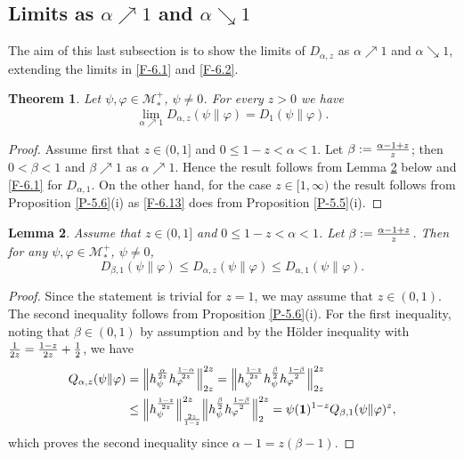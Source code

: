 \documentclass[12pt]{article}
\newtheorem{theorem}{Theorem}[section]
\newtheorem{lemma}[theorem]{Lemma}
\theoremstyle{definition}
\theoremstyle{remark}
\numberwithin{equation}{section}
\def\Me{\mathcal M}
\def\ffi{\varphi}
\def\1{\mathbf{1}}
\begin{document}
\subsection{Limits as $\alpha\nearrow1$ and $\alpha\searrow1$}

The aim of this last subsection is to show the limits of $D_{\alpha,z}$ as $\alpha\nearrow1$ and
$\alpha\searrow1$, extending the limits in \eqref{F-6.1} and \eqref{F-6.2}.

\begin{theorem}\label{T-6.7}
Let $\psi,\ffi\in\Me_*^+$, $\psi\ne0$. For every $z>0$ we have
\[
\lim_{\alpha\nearrow1}D_{\alpha,z}(\psi\|\ffi)=D_1(\psi\|\ffi).
\]
\end{theorem}

\begin{proof}
Assume first that $z\in(0,1]$ and $0\le1-z<\alpha<1$. Let $\beta:={\alpha-1+z\over z}$; then
$0<\beta<1$ and $\beta\nearrow1$ as $\alpha\nearrow1$. Hence the result follows from Lemma \ref{L-6.8}
below and \eqref{F-6.1} for $D_{\alpha,1}$. On the other hand, for the case $z\in[1,\infty)$ the result
follows from Proposition \ref{P-5.6}(i) as \eqref{F-6.13} does from Proposition \ref{P-5.5}(i).
\end{proof}

\begin{lemma}\label{L-6.8}
Assume that $z\in(0,1]$ and $0\le1-z<\alpha<1$. Let $\beta:={\alpha-1+z\over z}$. Then for any
$\psi,\ffi\in\Me_*^+$, $\psi\ne0$,
\[
D_{\beta,1}(\psi\|\ffi)\le D_{\alpha,z}(\psi\|\ffi)\le D_{\alpha,1}(\psi\|\ffi).
\]
\end{lemma}

\begin{proof}
Since the statement is trivial for $z=1$, we may assume that $z\in(0,1)$. The second inequality follows
from Proposition \ref{P-5.6}(i). For the first inequality, noting that $\beta\in(0,1)$ by assumption and 
by the H\"older inequality with ${1\over2z}={1-z\over2z}+{1\over2}$, we have
\begin{align*}
Q_{\alpha,z}(\psi\|\ffi)&=\Big\|h_\psi^{\alpha\over2z}h_\ffi^{1-\alpha\over2z}\Big\|_{2z}^{2z}
=\Big\|h_\psi^{1-z\over2z}h_\psi^{\beta\over2}h_\ffi^{1-\beta\over2}\Big\|_{2z}^{2z} \\
&\le\Big\|h_\psi^{1-z\over2z}\Big\|_{2z\over1-z}^{2z}
\Big\|h_\psi^{\beta\over2}h_\ffi^{1-\beta\over2}\Big\|_2^{2z}
=\psi(\1)^{1-z}Q_{\beta,1}(\psi\|\ffi)^z,
\end{align*}
which proves the second inequality since $\alpha-1=z(\beta-1)$.
\end{proof}
\end{document}
